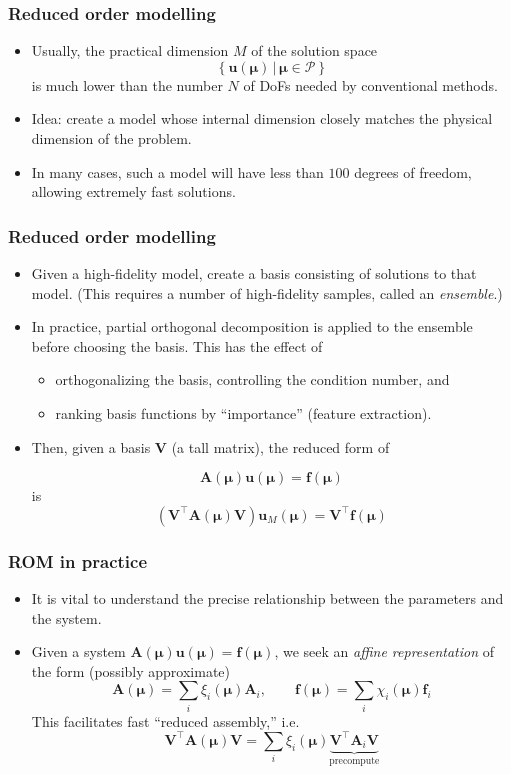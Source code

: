 \documentclass{beamer}
\begin{document}
\begin{frame}
  \frametitle{Reduced order modelling}
  \begin{itemize}
  \item Usually, the practical dimension $M$ of the solution space
    \[ \left\{ \bm u(\bm \mu) \,|\, \bm \mu \in \mathcal{P} \right\}\]
    is much lower than the number $N$ of DoFs needed by conventional methods.
  \item Idea: create a model whose internal dimension closely matches the
    physical dimension of the problem.
  \item In many cases, such a model will have less than $100$ degrees of
    freedom, allowing extremely fast solutions.
  \end{itemize}
\end{frame}

\begin{frame}
  \frametitle{Reduced order modelling}
  \begin{itemize}
  \item Given a high-fidelity model, create a basis consisting of solutions to
    that model. (This requires a number of high-fidelity samples, called an
    \emph{ensemble}.)
  \item In practice, partial orthogonal decomposition is applied to the ensemble
    before choosing the basis. This has the effect of
    \begin{itemize}
    \item orthogonalizing the basis, controlling the condition number, and
    \item ranking basis functions by ``importance'' (feature extraction).
    \end{itemize}
  \item Then, given a basis $\bm V$ (a tall matrix), the reduced form of

    \[
      \bm A(\bm \mu) \bm u(\bm \mu) = \bm f(\bm \mu)
    \]
    is
    \[
      \left( \bm V^\intercal \bm A(\bm \mu) \bm V \right) \bm u_M (\bm \mu)
      = \bm V^\intercal \bm f(\bm \mu)
    \]
  \end{itemize}
\end{frame}

\begin{frame}
  \frametitle{ROM in practice}
  \begin{itemize}
  \item It is vital to understand the precise relationship between the
    parameters and the system.
  \item Given a system $\bm A(\bm \mu) \bm u(\bm \mu) = \bm f(\bm \mu)$, we seek
    an \emph{affine representation} of the form (possibly approximate)
    \[
      \bm A(\bm \mu) = \sum_i \xi_i(\bm \mu) \bm A_i, \qquad
      \bm f(\bm \mu) = \sum_i \chi_i(\bm \mu) \bm f_i
    \]
    This facilitates fast ``reduced assembly,'' i.e.
    \[
      \bm V^\intercal \bm A(\bm \mu) \bm V =
      \sum_i \xi_i(\bm \mu)
      \underbrace{\bm V^\intercal \bm A_i \bm V}_{\text{precompute}}
    \]
  \end{itemize}
\end{frame}
\end{document}
